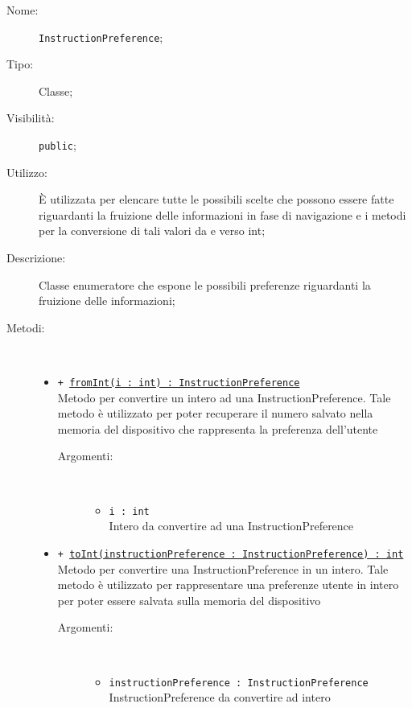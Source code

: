 \documentclass[../DefinizioneDiProdotto.tex]{subfiles}
\begin{document}
\begin{description}
	\item[Nome:] \texttt{InstructionPreference};
	\item[Tipo:] Classe;
	\item[Visibilità:] \texttt{public};
	\item[Utilizzo:] È utilizzata per elencare tutte le possibili scelte che possono essere fatte riguardanti la fruizione delle informazioni in fase di navigazione e i metodi per la conversione di tali valori da e verso int;
	\item[Descrizione:] Classe enumeratore che espone le possibili preferenze riguardanti la fruizione delle informazioni;
	\item[Metodi:] \
	\begin{itemize}
		\item \texttt{+ \underline{fromInt(i : int) : InstructionPreference}}\\
		Metodo per convertire un intero ad una InstructionPreference. Tale metodo è utilizzato per poter recuperare il numero salvato nella memoria del dispositivo che rappresenta la preferenza dell'utente
		\begin{description}
			\item[Argomenti:] \
			\begin{itemize}
				\item \texttt{i : int}\\
				Intero da convertire ad una InstructionPreference\end{itemize}
		\end{description}
		\item \texttt{+ \underline{toInt(instructionPreference : InstructionPreference) : int}}\\
		Metodo per convertire una InstructionPreference in un intero. Tale metodo è utilizzato per rappresentare una preferenze utente in intero per poter essere salvata sulla memoria del dispositivo
		\begin{description}
			\item[Argomenti:] \
			\begin{itemize}
				\item \texttt{instructionPreference : InstructionPreference}\\
				InstructionPreference da convertire ad intero\end{itemize}
		\end{description}
	\end{itemize}
\end{description}
\end{document}
